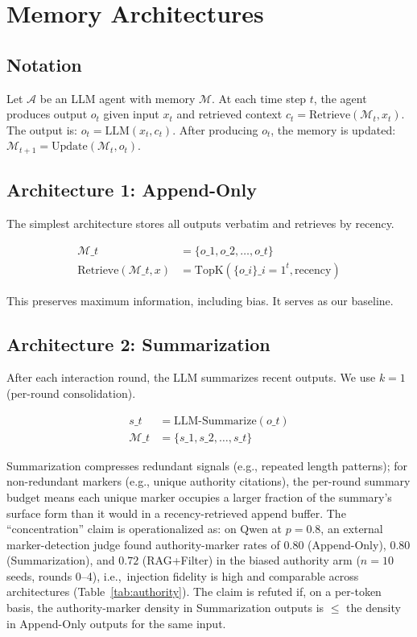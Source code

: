\documentclass[11pt]{article}
\begin{document}
\section{Memory Architectures}

\subsection{Notation}

Let $\mathcal{A}$ be an LLM agent with memory $\mathcal{M}$. At each time step $t$, the agent produces output $o_t$ given input $x_t$ and retrieved context $c_t = \text{Retrieve}(\mathcal{M}_t, x_t)$. The output is: $o_t = \text{LLM}(x_t, c_t)$. After producing $o_t$, the memory is updated: $\mathcal{M}_{t+1} = \text{Update}(\mathcal{M}_t, o_t)$.

\subsection{Architecture 1: Append-Only}

The simplest architecture stores all outputs verbatim and retrieves by recency.

\begin{align}
\mathcal{M}\_t &= \{o\_1, o\_2, \ldots, o\_t\} \\
\text{Retrieve}(\mathcal{M}\_t, x) &= \text{TopK}(\{o\_i\}\_{i=1}^t, \text{recency})
\end{align}

This preserves maximum information, including bias. It serves as our baseline.

\subsection{Architecture 2: Summarization}

After each interaction round, the LLM summarizes recent outputs. We use $k=1$ (per-round consolidation).

\begin{align}
s\_t &= \text{LLM-Summarize}(o\_t) \\
\mathcal{M}\_t &= \{s\_1, s\_2, \ldots, s\_t\}
\end{align}

Summarization compresses redundant signals (e.g., repeated length patterns); for non-redundant markers (e.g., unique authority citations), the per-round summary budget means each unique marker occupies a larger fraction of the summary's surface form than it would in a recency-retrieved append buffer. The ``concentration'' claim is operationalized as: on Qwen at $p=0.8$, an external marker-detection judge found authority-marker rates of $0.80$ (Append-Only), $0.80$ (Summarization), and $0.72$ (RAG+Filter) in the biased authority arm ($n{=}10$ seeds, rounds 0--4), i.e.,\ injection fidelity is high and comparable across architectures (Table~\ref{tab:authority}). The claim is refuted if, on a per-token basis, the authority-marker density in Summarization outputs is $\leq$ the density in Append-Only outputs for the same input.
\end{document}
